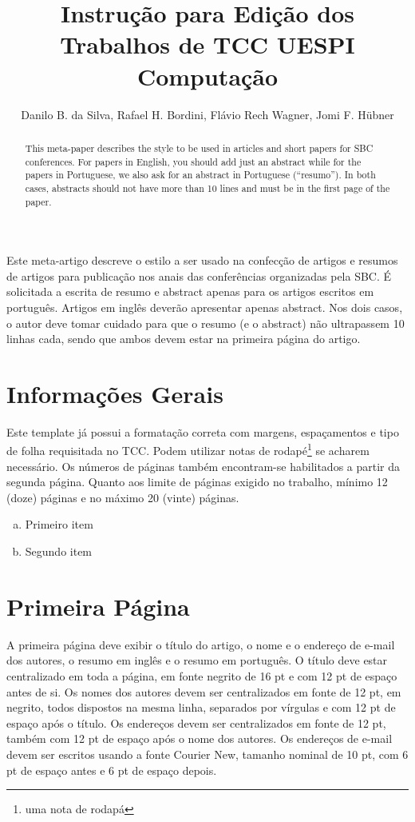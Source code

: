 \documentclass[12pt]{article}
\title{Instrução para Edição dos Trabalhos de TCC UESPI Computação}
\author{Danilo B. da Silva\inst{1}, Rafael H. Bordini\inst{2}, Flávio Rech
  Wagner\inst{1}, Jomi F. Hübner\inst{3} }
\begin{document}
 

\maketitle

\begin{abstract}
  This meta-paper describes the style to be used in articles and short papers
  for SBC conferences. For papers in English, you should add just an abstract
  while for the papers in Portuguese, we also ask for an abstract in
  Portuguese (``resumo''). In both cases, abstracts should not have more than
  10 lines and must be in the first page of the paper.
\end{abstract}
     
\begin{resumo} 
  Este meta-artigo descreve o estilo a ser usado na confecção de artigos e
  resumos de artigos para publicação nos anais das conferências organizadas
  pela SBC. É solicitada a escrita de resumo e abstract apenas para os artigos
  escritos em português. Artigos em inglês deverão apresentar apenas abstract.
  Nos dois casos, o autor deve tomar cuidado para que o resumo (e o abstract)
  não ultrapassem 10 linhas cada, sendo que ambos devem estar na primeira
  página do artigo.
\end{resumo}


\section{Informações Gerais}

Este template já possui a formatação correta com margens, espaçamentos e tipo de folha requisitada no TCC. Podem utilizar notas de rodapé\footnote{uma nota de rodapá} se acharem necessário. Os números de páginas também encontram-se habilitados a partir da segunda página. Quanto aos limite de páginas exigido no trabalho, mínimo 12 (doze) páginas e no máximo 20 (vinte) páginas.
\begin{enumerate}[a)]
\item Primeiro item
\item Segundo item
\end{enumerate}

\section{Primeira Página} \label{sec:firstpage}

A primeira página deve exibir o título do artigo, o nome e o endereço de e-mail dos autores, o resumo em inglês e o resumo em português. O título deve estar centralizado em toda a página, em fonte negrito de 16 pt e com 12 pt de espaço antes de si. Os nomes dos autores devem ser centralizados em fonte de 12 pt, em negrito, todos dispostos na mesma linha, separados por vírgulas e com 12 pt de espaço após o título. Os endereços devem ser centralizados em fonte de 12 pt, também com 12 pt de espaço após o nome dos autores. Os endereços de e-mail devem ser escritos usando a fonte Courier New, tamanho nominal de 10 pt, com 6 pt de espaço antes e 6 pt de espaço depois.
\end{document}
